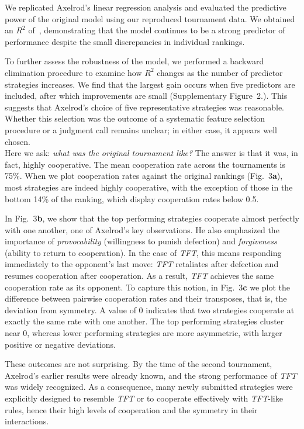 \documentclass{article}
\newcommand{\TFT}{\emph{TFT}}
\begin{document}
We replicated Axelrod's linear regression analysis and evaluated the predictive
power of the original model using our reproduced tournament data. We
obtained an \(R^2\) of~\unskip,
demonstrating that
the model continues to be a strong predictor of performance despite the small
discrepancies in individual rankings.

To further assess the robustness of the model, we performed a backward
elimination procedure to examine how \(R^2\) changes as the number of predictor
strategies increases. We find that the largest gain occurs when five predictors
are included, after which improvements are small (Supplementary Figure~2.). This suggests that
Axelrod's choice of five representative strategies was reasonable. Whether this
selection was the outcome of a systematic feature selection procedure or a
judgment call remains unclear; in either case, it appears well chosen.\\

Here we ask: \emph{what was the original tournament like?} The answer is that it
was, in fact, highly cooperative. The mean cooperation rate across the
tournaments is 75\%. When we plot cooperation rates against the original
rankings (Fig.~3\textbf{a}), most strategies are
indeed highly cooperative, with the exception of those in the bottom 14\% of the
ranking, which display cooperation rates below 0.5.

In Fig.~3\textbf{b}, we show that the
top performing strategies cooperate almost perfectly with one another, one of
Axelrod's key observations. He also emphasized the importance of
\emph{provocability} (willingness to punish defection) and \emph{forgiveness}
(ability to return to cooperation). In the case of \TFT, this means responding
immediately to the opponent's last move: \TFT{} retaliates after defection and
resumes cooperation after cooperation. As a result, \TFT{} achieves
the same cooperation rate as its opponent. To capture this notion, in
Fig.~3\textbf{c} we plot the difference between
pairwise cooperation rates and their transposes, that is, the deviation from
symmetry. A value of 0 indicates that two strategies cooperate at exactly the
same rate with one another. The top performing strategies cluster near 0,
whereas lower performing strategies are more asymmetric, with larger positive or
negative deviations.

These outcomes are not surprising. By the time of the second tournament,
Axelrod's earlier results were already known, and the strong performance of
\TFT{} was widely recognized. As a consequence, many newly submitted strategies
were explicitly designed to resemble \TFT{} or to cooperate effectively with
\TFT{}-like rules, hence their high levels of cooperation and the
symmetry in their interactions.\\
\end{document}
